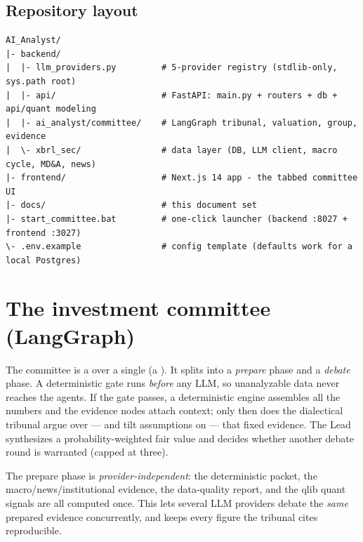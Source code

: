 \documentclass[11pt]{article}
\begin{document}
\subsection{Repository layout}
\begin{lstlisting}
AI_Analyst/
|- backend/
|  |- llm_providers.py         # 5-provider registry (stdlib-only, sys.path root)
|  |- api/                     # FastAPI: main.py + routers + db + api/quant modeling
|  |- ai_analyst/committee/    # LangGraph tribunal, valuation, group, evidence
|  \- xbrl_sec/                # data layer (DB, LLM client, macro cycle, MD&A, news)
|- frontend/                   # Next.js 14 app - the tabbed committee UI
|- docs/                       # this document set
|- start_committee.bat         # one-click launcher (backend :8027 + frontend :3027)
\- .env.example                # config template (defaults work for a local Postgres)
\end{lstlisting}

\section{The investment committee (LangGraph)}

The committee is a  over a single 
(a ). It splits into a \emph{prepare} phase and a \emph{debate}
phase. A deterministic gate runs \emph{before} any LLM, so unanalyzable data never
reaches the agents. If the gate passes, a deterministic engine assembles all the
numbers and the evidence nodes attach context; only then does the dialectical
tribunal argue over --- and tilt assumptions on --- that fixed evidence. The Lead
synthesizes a probability-weighted fair value and decides whether another debate
round is warranted (capped at three).

\begin{keybox}
The prepare phase is \emph{provider-independent}: the deterministic packet, the
macro/news/institutional evidence, the data-quality report, and the qlib quant
signals are all computed once. This lets several LLM providers debate the
\emph{same} prepared evidence concurrently, and keeps every figure the tribunal
cites reproducible.
\end{keybox}
\end{document}
